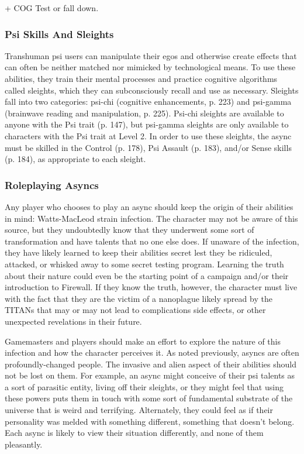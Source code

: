 + COG Test or fall down.

\subsubsection{Psi Skills And Sleights}

Transhuman psi users can manipulate their egos and 
otherwise create effects that can often be neither 
matched nor mimicked by technological means. To use 
these abilities, they train their mental processes and 
practice cognitive algorithms called sleights, which 
they can subconsciously recall and use as necessary. 
Sleights fall into two categories: psi-chi (cognitive 
enhancements, p. 223) and psi-gamma (brainwave 
reading and manipulation, p. 225). Psi-chi sleights are 
available to anyone with the Psi trait (p. 147), but psi-gamma
sleights are only available to characters with
the Psi trait at Level 2. In order to use these sleights, 
the async must be skilled in the Control (p. 178), Psi 
Assault (p. 183), and/or Sense skills (p. 184), as appropriate
to each sleight.

\subsubsection{Roleplaying Asyncs}

Any player who chooses to play an async should keep 
the origin of their abilities in mind: Watts-MacLeod 
strain infection. The character may not be aware of 
this source, but they undoubtedly know that they underwent
some sort of transformation and have talents
that no one else does. If unaware of the infection, they 
have likely learned to keep their abilities secret lest 
they be ridiculed, attacked, or whisked away to some 
secret testing program. Learning the truth about their 
nature could even be the starting point of a campaign 
and/or their introduction to Firewall. If they know the 
truth, however, the character must live with the fact 
that they are the victim of a nanoplague likely spread 
by the TITANs that may or may not lead to complications
side effects, or other unexpected revelations in
their future.

Gamemasters and players should make an effort 
to explore the nature of this infection and how the 
character perceives it. As noted previously, asyncs are 
often profoundly-changed people. The invasive and 
alien aspect of their abilities should not be lost on 
them. For example, an async might conceive of their 
psi talents as a sort of parasitic entity, living off their 
sleights, or they might feel that using these powers 
puts them in touch with some sort of fundamental 
substrate of the universe that is weird and terrifying. 
Alternately, they could feel as if their personality was 
melded with something different, something that 
doesn't belong. Each async is likely to view their situation
differently, and none of them pleasantly.

